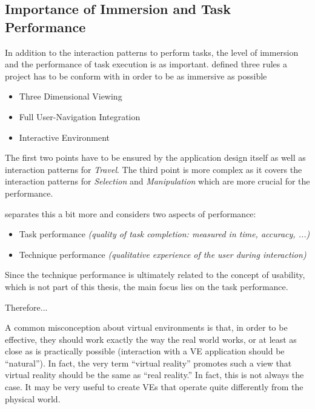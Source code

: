 
\subsection{Importance of Immersion and Task Performance}

In addition to the interaction patterns to perform tasks, the level of immersion and the performance of task execution is as important. \newline
\cite{Woodard2015} defined three rules a project has to be conform with in order to be as immersive as possible
\begin{itemize}[noitemsep,nolistsep]
	\item Three Dimensional Viewing
	\item Full User-Navigation Integration
	\item Interactive Environment
\end{itemize}
The first two points have to be ensured by the application design itself as well as interaction patterns for \textit{Travel}. The third point is more complex as it covers the interaction patterns for \textit{Selection} and \textit{Manipulation} which are more crucial for the performance.

\cite{Bowman2002} separates this a bit more and considers two aspects of performance:
\begin{itemize}[noitemsep,nolistsep]
	\item Task performance \textit{(quality of task completion: measured in time, accuracy, ...)}
	\item Technique performance \textit{(qualitative experience of the user during interaction)}
\end{itemize}
Since the technique performance is ultimately related to the concept of usability, which is not part of this thesis, the main focus lies on the task performance.

Therefore...





A common misconception about virtual environments is that, in order to be effective, they should work exactly the way the real world works, or at least as close as is practically possible (interaction with a VE application should be “natural”). In fact, the very term “virtual reality” promotes such a view that virtual reality should be the same as “real reality.” In fact, this is not always the case. It may be very useful to create VEs that operate quite differently from the physical world. \cite{Bowman2002}


